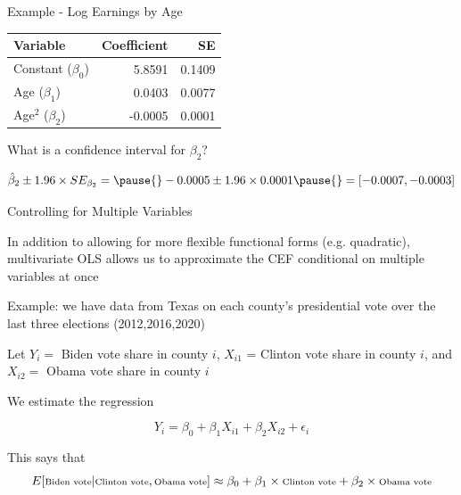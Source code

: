 \documentclass[11pt,english,handout]{beamer}
\newenvironment{wideitemize}{\itemize\addtolength{\itemsep}{10pt}}{\enditemize}
\begin{document}
	\begin{frame}{Example - Log Earnings by Age} 
		
		\begin{tabular}{lrr}
			Variable & Coefficient & SE \\ \hline
			Constant ($\beta_0$) & 5.8591 & 0.1409 \\
			Age ($\beta_1$) & 0.0403 &  0.0077\\
			Age$^2$ ($\beta_2$) & -0.0005 & 0.0001
		\end{tabular}
\medskip
		
		
		\begin{wideitemize}
			\item
			What is a confidence interval for $\beta_2$? 
			
			\pause{}
			$$\hat\beta_2 \pm 1.96 \times SE_{\beta_2} = \pause{} -0.0005 \pm 1.96 \times 0.0001 \pause{} = [-0.0007, -0.0003]  $$
		\end{wideitemize}
	\end{frame}


	\begin{frame}{Controlling for Multiple Variables} 
		\begin{wideitemize}
			\item
			In addition to allowing for more flexible functional forms (e.g. quadratic), multivariate OLS allows us to approximate the CEF conditional on multiple variables at once
			
			\pause
			\item
			Example: we have data from Texas on each county's presidential vote over the last three elections (2012,2016,2020)
			
			\pause
			\item
			Let $Y_i = $ Biden vote share in county $i$, $X_{i1}$ = Clinton vote share in county $i$, and $X_{i2} = $ Obama vote share in county $i$
			
			\pause
			\item
			We estimate the regression 
			
			$$Y_i = \beta_0 + \beta_1 X_{i1} + \beta_2 X_{i2} + \epsilon_i$$
			
			\pause
			\item 
			This says that 
			$$\scriptsize  E[  \text{Biden vote} | \text{Clinton vote} , \text{Obama vote} ] \approx \beta_0 + \beta_1 \times \text{Clinton vote} + \beta_2 \times \text{Obama vote}  $$
		\end{wideitemize}	
	\end{frame}
	
\end{document}

